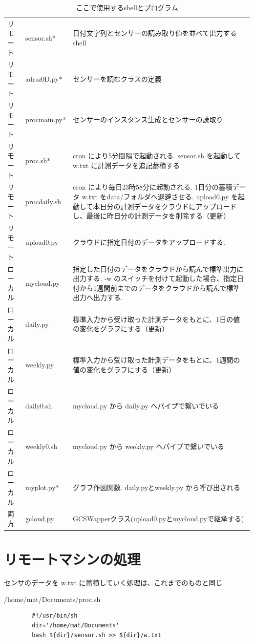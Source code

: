 \documentclass[12pt,a4paper,uplatex]{jsbook}
\begin{document}
\begin{table}[h]
	\centering
	\caption{ここで使用するshellとプログラム}
	\label{tab:local}
	\begin{tabular}{p{1.3cm}lp{8.5cm}}
		\hline
		リモート & sensor.sh{*} & 日付文字列とセンサーの読み取り値を並べて出力するshell \\
		リモート & adrsz0D.py{*} & センサーを読むクラスの定義 \\
		リモート & procmain.py{*} & センサーのインスタンス生成とセンサーの読取り \\
		リモート & proc.sh{*} & cron により5分間隔で起動される. sensor.sh を起動して w.txt に計測データを追記蓄積する \\
		リモート & procdaily.sh & cron により毎日23時58分に起動される. 1日分の蓄積データ w.txt をdata/フォルダへ退避させる. upload0.py を起動して本日分の計測データをクラウドにアップロードし、最後に昨日分の計測データを削除する（更新） \\
		リモート & upload0.py & クラウドに指定日付のデータをアップロードする.  \\
		ローカル & mycloud.py & 指定した日付のデータをクラウドから読んで標準出力に出力する. -w のスイッチを付けて起動した場合、指定日付から1週間前までのデータをクラウドから読んで標準出力へ出力する.   \\
		ローカル & daily.py & 標準入力から受け取った計測データをもとに、1日の値の変化をグラフにする（更新） \\
		ローカル & weekly.py & 標準入力から受け取った計測データをもとに、1週間の値の変化をグラフにする（更新） \\
		ローカル & daily0.sh & mycloud.py から daily.py へパイプで繋いでいる \\
		ローカル & weekly0.sh & mycloud.py から weekly.py へパイプで繋いでいる \\
		ローカル & myplot.py{*} & グラフ作図関数. daily.pyとweekly.py から呼び出される \\
		両方 & gcloud.py & GCSWapperクラス(upload0.pyとmycloud.pyで継承する) \\ \hline
	\end{tabular}
\end{table}

\section{リモートマシンの処理}

センサのデータを w.txt に蓄積していく処理は、これまでのものと同じ

\begin{itembox}[l]{/home/mat/Documents/proc.sh}
	\begin{verbatim}
		#!/usr/bin/sh
		dir='/home/mat/Documents'
		bash ${dir}/sensor.sh >> ${dir}/w.txt
	\end{verbatim}
\end{itembox}
\end{document}
